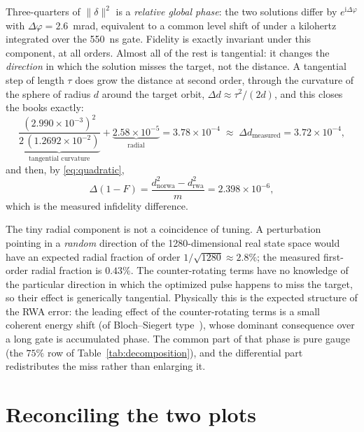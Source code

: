 \documentclass[11pt]{article}
\newcommand{\ii}{\mathrm{i}}
\newcommand{\norm}[1]{\lVert #1 \rVert}
\begin{document}
Three-quarters of $\norm{\delta}^2$ is a \emph{relative global phase}: the two
solutions differ by $e^{\ii\Delta\varphi}$ with $\Delta\varphi = 2.6$~mrad,
equivalent to a common level shift of under a kilohertz integrated over the
550~ns gate.  Fidelity is exactly invariant under this component, at all
orders.  Almost all of the rest is tangential: it changes the \emph{direction}
in which the solution misses the target, not the distance.  A tangential step
of length $\tau$ does grow the distance at second order, through the curvature
of the sphere of radius $d$ around the target orbit,
$\Delta d \approx \tau^2/(2d)$, and this closes the books exactly:
\begin{equation}
    \underbrace{\frac{(2.990\times10^{-3})^2}{2\,(1.2692\times10^{-2})}}_{\text{tangential curvature}}
    + \underbrace{2.58\times10^{-5}}_{\text{radial}}
    = 3.78\times10^{-4}
    \;\approx\;
    \Delta d_{\mathrm{measured}} = 3.72\times10^{-4},
\end{equation}
and then, by \eqref{eq:quadratic},
\begin{equation}
    \Delta(1-F)
    = \frac{d_{\mathrm{norwa}}^2 - d_{\mathrm{rwa}}^2}{m}
    = 2.398\times10^{-6},
\end{equation}
which is the measured infidelity difference.

The tiny radial component is not a coincidence of tuning.  A perturbation
pointing in a \emph{random} direction of the 1280-dimensional real state space
would have an expected radial fraction of order $1/\sqrt{1280} \approx 2.8\%$;
the measured first-order radial fraction is $0.43\%$.  The counter-rotating
terms have no knowledge of the particular direction in which the optimized
pulse happens to miss the target, so their effect is generically tangential.
Physically this is the expected structure of the RWA error: the leading effect
of the counter-rotating terms is a small coherent energy shift (of
Bloch--Siegert type~\cite{BlochSiegert1940, Zeuch2020}), whose dominant
consequence over a long gate is accumulated phase.  The common part of that
phase is pure gauge (the $75\%$ row of Table~\ref{tab:decomposition}), and the
differential part redistributes the miss rather than enlarging it.

\section{Reconciling the two plots}
\end{document}
